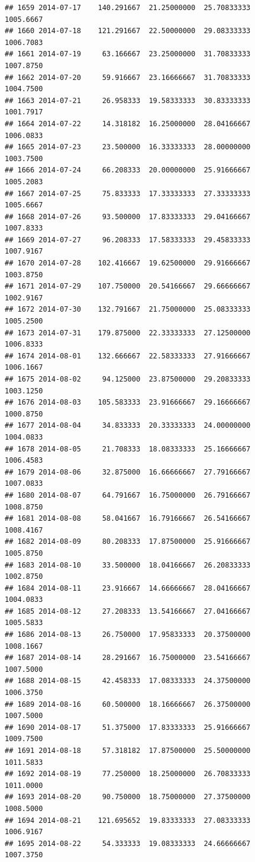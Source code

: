 \documentclass[
]{article}
\begin{document}
\begin{verbatim}
## 1659 2014-07-17    140.291667  21.25000000  25.70833333    1005.6667
## 1660 2014-07-18    121.291667  22.50000000  29.08333333    1006.7083
## 1661 2014-07-19     63.166667  23.25000000  31.70833333    1007.8750
## 1662 2014-07-20     59.916667  23.16666667  31.70833333    1004.7500
## 1663 2014-07-21     26.958333  19.58333333  30.83333333    1001.7917
## 1664 2014-07-22     14.318182  16.25000000  28.04166667    1006.0833
## 1665 2014-07-23     23.500000  16.33333333  28.00000000    1003.7500
## 1666 2014-07-24     66.208333  20.00000000  25.91666667    1005.2083
## 1667 2014-07-25     75.833333  17.33333333  27.33333333    1005.6667
## 1668 2014-07-26     93.500000  17.83333333  29.04166667    1007.8333
## 1669 2014-07-27     96.208333  17.58333333  29.45833333    1007.9167
## 1670 2014-07-28    102.416667  19.62500000  29.91666667    1003.8750
## 1671 2014-07-29    107.750000  20.54166667  29.66666667    1002.9167
## 1672 2014-07-30    132.791667  21.75000000  25.08333333    1005.2500
## 1673 2014-07-31    179.875000  22.33333333  27.12500000    1006.8333
## 1674 2014-08-01    132.666667  22.58333333  27.91666667    1006.1667
## 1675 2014-08-02     94.125000  23.87500000  29.20833333    1003.1250
## 1676 2014-08-03    105.583333  23.91666667  29.16666667    1000.8750
## 1677 2014-08-04     34.833333  20.33333333  24.00000000    1004.0833
## 1678 2014-08-05     21.708333  18.08333333  25.16666667    1006.4583
## 1679 2014-08-06     32.875000  16.66666667  27.79166667    1007.0833
## 1680 2014-08-07     64.791667  16.75000000  26.79166667    1008.8750
## 1681 2014-08-08     58.041667  16.79166667  26.54166667    1008.4167
## 1682 2014-08-09     80.208333  17.87500000  25.91666667    1005.8750
## 1683 2014-08-10     33.500000  18.04166667  26.20833333    1002.8750
## 1684 2014-08-11     23.916667  14.66666667  28.04166667    1004.0833
## 1685 2014-08-12     27.208333  13.54166667  27.04166667    1005.5833
## 1686 2014-08-13     26.750000  17.95833333  20.37500000    1008.1667
## 1687 2014-08-14     28.291667  16.75000000  23.54166667    1007.5000
## 1688 2014-08-15     42.458333  17.08333333  24.37500000    1006.3750
## 1689 2014-08-16     60.500000  18.16666667  26.37500000    1007.5000
## 1690 2014-08-17     51.375000  17.83333333  25.91666667    1009.7500
## 1691 2014-08-18     57.318182  17.87500000  25.50000000    1011.5833
## 1692 2014-08-19     77.250000  18.25000000  26.70833333    1011.0000
## 1693 2014-08-20     90.750000  18.75000000  27.37500000    1008.5000
## 1694 2014-08-21    121.695652  19.83333333  27.08333333    1006.9167
## 1695 2014-08-22     54.333333  19.08333333  24.66666667    1007.3750

\end{verbatim}
\end{document}
